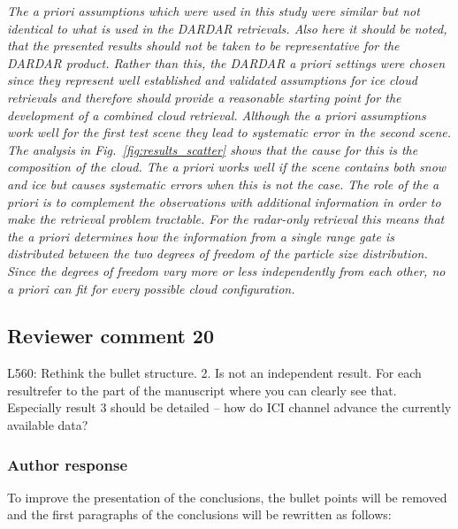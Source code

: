 \documentclass[11pt]{scrartcl}
\begin{document}
{\itshape 
  The a priori assumptions which were used in this study were similar but not
  identical to what is used in the DARDAR retrievals. Also here it should be
  noted, that the presented results should not be taken to be representative for
  the DARDAR product. Rather than this, the DARDAR a priori settings were chosen
  since they represent well established and validated assumptions for ice cloud
  retrievals and therefore should provide a reasonable starting point for the
  development of a combined cloud retrieval. Although the a priori assumptions
  work well for the first test scene they lead to systematic error in the second
  scene. The analysis in Fig.~\ref{fig:results_scatter} shows that the cause for
  this is the composition of the cloud. The a priori works well if the scene
  contains both snow and ice but causes systematic errors when this is not the
  case. The role of the a priori is to complement the observations with additional
  information in order to make the retrieval problem tractable. For the radar-only
  retrieval this means that the a priori determines how the information from a
  single range gate is distributed between the two degrees of freedom of the
  particle size distribution. Since the degrees of freedom vary more or less
  independently from each other, no a priori can fit for every possible cloud
  configuration.
}

\subsection*{Reviewer comment 20}
L560:  Rethink the bullet structure.  2.  Is not an independent result.  For each resultrefer to the part of the manuscript where you can clearly see that.  Especially result 3 should be detailed – how do ICI channel advance the currently available data?

\subsubsection*{Author response}

To improve the presentation of the conclusions, the bullet points will be removed
and the first paragraphs of the conclusions will be rewritten as follows:
\end{document}

